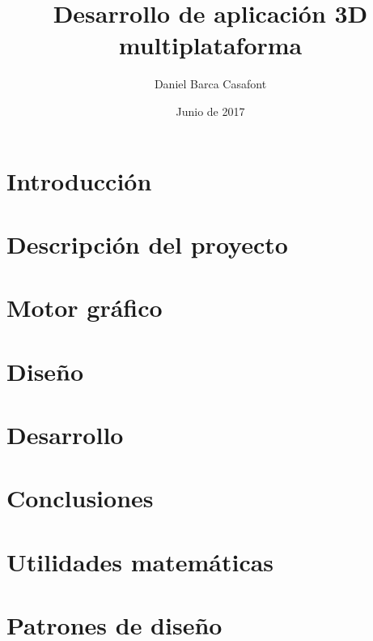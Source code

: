 \documentclass{report}
\title{Desarrollo de aplicación 3D multiplataforma}
\author{Daniel Barca Casafont}
\date{Junio de 2017}
\begin{document}
\begin{titlepage}
\maketitle
\end{titlepage}

\cleardoublepage
\tableofcontents
\cleardoublepage
{}

\chapter{Introducción}


\cleardoublepage
\chapter{Descripción del proyecto}


\cleardoublepage
\chapter{Motor gráfico}







\cleardoublepage
\chapter{Diseño}


\cleardoublepage
\chapter{Desarrollo}


\cleardoublepage
\chapter{Conclusiones}

\cleardoublepage
\appendix
\chapter{Utilidades matemáticas}


\chapter{Patrones de diseño}




\end{document}
